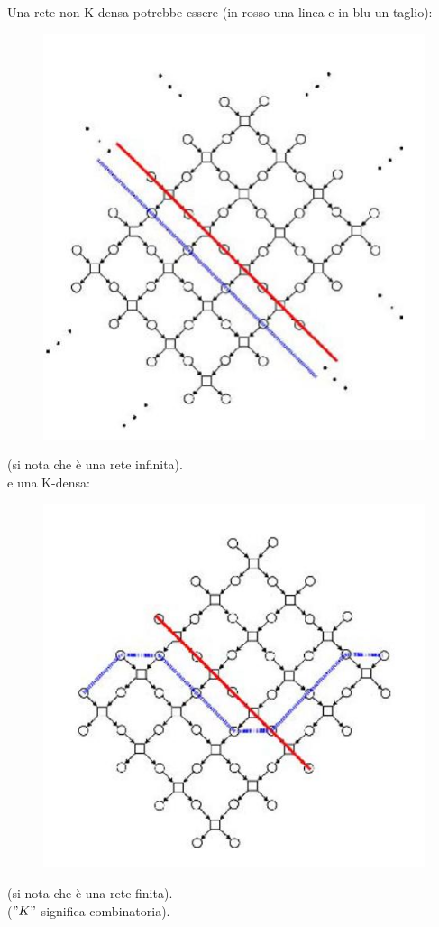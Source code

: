   \begin{esempio}
  Una rete non K-densa potrebbe essere (in rosso una linea e in blu un taglio):
  \begin{figure}[H]
    \centering
    \includegraphics[scale = 0.36]{img/de1.jpg} 
  \end{figure}
  (si nota che è una rete infinita).\\
  e una K-densa:
  \begin{figure}[H]
    \centering
    \includegraphics[scale = 0.36]{img/de2.jpg} 
  \end{figure}
  (si nota che è una rete finita).\\
  ($"K"$ significa combinatoria).
\end{esempio}

